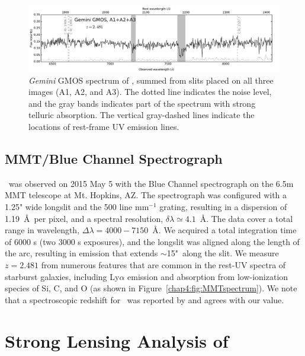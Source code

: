 \begin{figure}
\includegraphics[width=\textwidth]{Chap4/c4f2.pdf}
\caption[GMOS spectrum of \giantarc]{\textit{Gemini} GMOS spectrum of \giantarc, summed from slits placed on all three images (A1, A2, and A3). The dotted line indicates the noise level, and the gray bands indicates part of the spectrum with strong telluric absorption. The vertical gray-dashed lines indicate the locations of rest-frame UV emission lines.}
\label{chap4:fig:GMOSspectrum}
\end{figure}

\subsection{MMT/Blue Channel Spectrograph}
\giantarc\ was observed on 2015 May 5 with the Blue Channel spectrograph on the 6.5m MMT telescope at Mt. Hopkins, AZ. The spectrograph was configured with a 1.25" wide longslit and the 500 line mm$^{-1}$ grating, resulting in a dispersion of 1.19~\AA\ per pixel, and a spectral resolution, $\delta \lambda \simeq 4.1$~\AA. The data cover a total range in wavelength, $\Delta\lambda = 4000-7150$~\AA. We acquired a total integration time of 6000 s (two 3000 s exposures), and the longslit was aligned along the length of the arc, resulting in emission that extends $\sim$15"\ along the slit. We measure $z = 2.481$ from numerous features that are common in the rest-UV spectra of starburst galaxies, including Ly$\alpha$ emission and absorption from low-ionization species of Si, C, and O (as shown in Figure~\ref{chap4:fig:MMTspectrum}). We note that a spectroscopic redshift for \giantarc\ was reported by \citet{Stark:2013kl} and agrees with our value.

\section{Strong Lensing Analysis of \cluster}
\label{chap4:sec:lensmodel}

